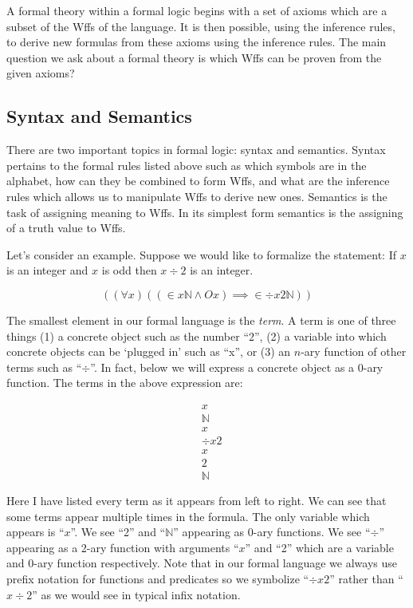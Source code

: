 \documentclass[12pt]{article}
\newcommand{\qq}[1]{``#1''}
\begin{document}
A formal theory within a formal logic begins with a set of axioms which are a subset of the Wffs of the language. 
It is then possible, using the inference rules, to derive new formulas from these axioms using the inference rules.
The main question we ask about a formal theory is which Wffs can be proven from the given axioms?

\subsection{Syntax and Semantics}
There are two important topics in formal logic: syntax and semantics.
Syntax pertains to the formal rules listed above such as which symbols are in the alphabet, how can they be combined to form Wffs, and what are the inference rules which allows us to manipulate Wffs to derive new ones.
Semantics is the task of assigning meaning to Wffs.
In its simplest form semantics is the assigning of a truth value to Wffs.

Let's consider an example.
Suppose we would like to formalize the statement: If $x$ is an integer and $x$ is odd then $x \div 2$ is an integer.

$$
((\forall x)((\in x \mathbb{N} \land Ox)\implies \in \div x 2 \mathbb{N}))
$$

The smallest element in our formal language is the \textit{term}.
A term is one of three things (1) a concrete object such as the number \qq{2}, (2) a variable into which concrete objects can be `plugged in' such as \qq{x}, or (3) an $n$-ary function of other terms such as \qq{$\div$}.
In fact, below we will express a concrete object as a 0-ary function.
The terms in the above expression are:

\begin{align}
& x \\
& \mathbb{N} \\
& x \\
& \div x 2 \\
& x \\
& 2 \\
& \mathbb{N}
\end{align}

Here I have listed every term as it appears from left to right.
We can see that some terms appear multiple times in the formula.
The only variable which appears is \qq{$x$}.
We see \qq{2} and \qq{$\mathbb{N}$} appearing as 0-ary functions.
We see \qq{$\div$} appearing as a 2-ary function with arguments \qq{$x$} and \qq{2} which are a variable and 0-ary function respectively.
Note that in our formal language we always use prefix notation for functions and predicates so we symbolize \qq{$\div x2$} rather than \qq{$x \div 2$} as we would see in typical infix notation.
\end{document}
